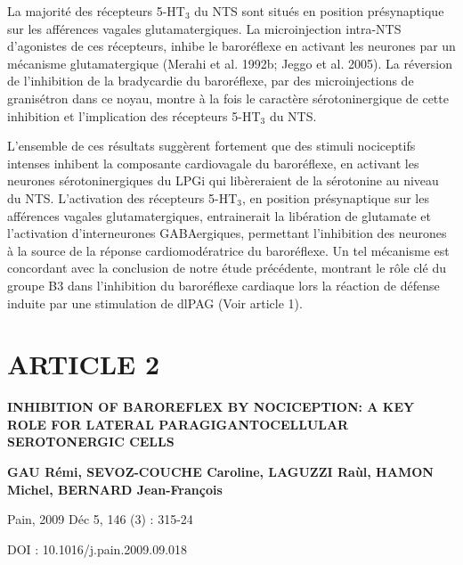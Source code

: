 \documentclass[a4paper,12pt,twoside]{report}
\begin{document}
La majorité des récepteurs 5-HT$_{3}$ du NTS sont situés en position présynaptique sur les afférences vagales glutamatergiques. La microinjection intra-NTS d’agonistes de ces récepteurs, inhibe le baroréflexe en activant les neurones par un mécanisme glutamatergique (Merahi et al. 1992b; Jeggo et al. 2005). La réversion de l’inhibition de la bradycardie du baroréflexe, par des microinjections de granisétron dans ce noyau, montre à la fois le caractère sérotoninergique de cette inhibition et l’implication des récepteurs 5-HT$_{3}$ du NTS.

L’ensemble de ces résultats suggèrent fortement que des stimuli nociceptifs intenses inhibent la composante cardiovagale du baroréflexe, en activant les neurones sérotoninergiques du LPGi qui libèreraient de la sérotonine au niveau du NTS. L’activation des récepteurs 5-HT$_{3}$, en position présynaptique sur les afférences vagales glutamatergiques, entrainerait la libération de glutamate et l’activation d’interneurones GABAergiques, permettant l’inhibition des neurones à la source de la réponse cardiomodératrice du baroréflexe. Un tel mécanisme est concordant avec la conclusion de notre étude précédente, montrant le rôle clé du groupe B3 dans l’inhibition du baroréflexe cardiaque lors la réaction de défense induite par une stimulation de dlPAG (Voir article 1).

\cleardoublepage

\section{ARTICLE 2}

\vfill

\begin{center}

\begin{LARGE}
\textbf{INHIBITION OF BAROREFLEX BY NOCICEPTION: A KEY ROLE FOR LATERAL PARAGIGANTOCELLULAR SEROTONERGIC CELLS}
\end{LARGE}

\bigskip

\begin{large} 
\textbf{GAU Rémi, SEVOZ-COUCHE Caroline, LAGUZZI Raùl, HAMON Michel, BERNARD Jean-François} \end{large}

\bigskip

Pain, 2009 Déc 5, 146 (3) : 315-24

DOI : 10.1016/j.pain.2009.09.018

\vfill

\end{center}
\end{document}
